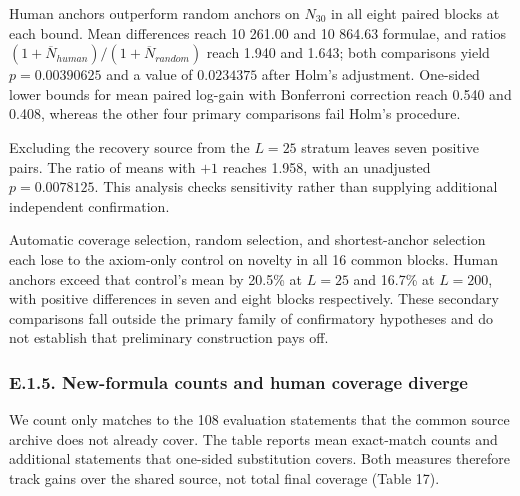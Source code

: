 \documentclass[pdflatex,sn-basic,Numbered]{sn-jnl}
\begin{document}
Human anchors outperform random anchors on \(N_{30}\) in all eight paired blocks at each bound. Mean differences reach 10 261.00 and 10 864.63 formulae, and ratios \((1 + {\overline{N}}_{human})/(1 + {\overline{N}}_{random})\) reach 1.940 and 1.643; both comparisons yield \(p = 0.00390625\) and a value of \(0.0234375\) after Holm's adjustment. One-sided lower bounds for mean paired log-gain with Bonferroni correction reach 0.540 and 0.408, whereas the other four primary comparisons fail Holm's procedure.

Excluding the recovery source from the \(L = 25\) stratum leaves seven positive pairs. The ratio of means with \(+ 1\) reaches 1.958, with an unadjusted \(p = 0.0078125\). This analysis checks sensitivity rather than supplying additional independent confirmation.

Automatic coverage selection, random selection, and shortest-anchor selection each lose to the axiom-only control on novelty in all 16 common blocks. Human anchors exceed that control's mean by 20.5\% at \(L = 25\) and 16.7\% at \(L = 200\), with positive differences in seven and eight blocks respectively. These secondary comparisons fall outside the primary family of confirmatory hypotheses and do not establish that preliminary construction pays off.

\subsubsection*{E.1.5. New-formula counts and human coverage diverge}\label{e.1.5.-new-formula-counts-and-human-coverage-diverge}

We count only matches to the 108 evaluation statements that the common source archive does not already cover. The table reports mean exact-match counts and additional statements that one-sided substitution covers. Both measures therefore track gains over the shared source, not total final coverage (Table 17).

\begingroup
\small
\setlength{\tabcolsep}{3pt}
\renewcommand{\arraystretch}{1.13}
\end{document}
